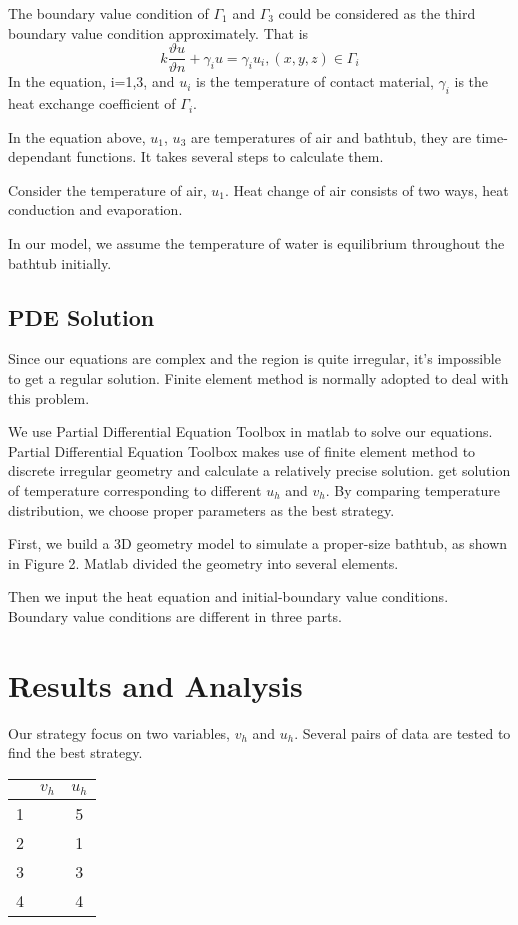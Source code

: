\documentclass[12pt,a4paper,titlepage]{article}
\begin{document}
The boundary value condition of ${\Gamma}_1$ and ${\Gamma}_3$ could be considered as the third boundary value condition approximately. That is
\begin{equation}
 k\frac{\vartheta u}{\vartheta n}+{{\gamma}_i}u={{\gamma}_i}{u_i}, (x,y,z)\in {\Gamma}_i
\end{equation}
In the equation, i=1,3, and $u_i$ is the temperature of contact material,
${\gamma}_i$ is the heat exchange coefficient of ${\Gamma}_i$.

In the equation above, $u_1$, $u_3$ are temperatures of air and bathtub, they are time-dependant functions. It takes several steps to calculate them.

Consider the temperature of air, $u_1$. Heat change of air consists of two ways, heat conduction and evaporation.

In our model, we assume the temperature of water is equilibrium throughout the bathtub initially.

\subsection{PDE Solution}
\label{sec:PDE solution}
Since our equations are complex and the region is quite irregular, it's impossible to get a regular solution. Finite element method is normally adopted to deal with this problem.

We use Partial Differential Equation Toolbox in matlab to solve our equations. Partial Differential Equation Toolbox makes use of finite element method to discrete irregular geometry and calculate a relatively precise solution. get solution of temperature corresponding to different $u_h$ and $v_h$. By comparing temperature distribution, we choose proper parameters as the best strategy.

First, we build a 3D geometry model to simulate a proper-size bathtub, as shown in Figure 2. Matlab divided the geometry into several elements.

Then we input the heat equation and initial-boundary value conditions. Boundary value conditions are different in three parts.

\section{Results and Analysis}
\label{sec:performance-and-analysis}

Our strategy focus on two variables, $v_h$ and $u_h$. Several pairs of data are tested to find the best strategy.
\begin{center}
\begin{tabular}{|c|c|c|}
\hline
      &$v_h$  &$u_h$        \\ \hline
 1    &             & 5              \\ \hline
 2    &             & 1              \\ \hline
 3    &             & 3              \\ \hline
 4    &             & 4              \\ \hline
\end{tabular}
\end{center}
\end{document}
